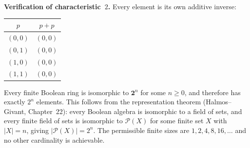 \begin{example*}
\medskip
\noindent\textbf{Verification of characteristic~$2$.}
Every element is its own additive inverse:
\begin{center}
\renewcommand{\arraystretch}{1.2}
\begin{tabular}{cc}
\toprule
$p$     & $p + p$ \\ \midrule
$(0,0)$ & $(0,0)$ \\
$(0,1)$ & $(0,0)$ \\
$(1,0)$ & $(0,0)$ \\
$(1,1)$ & $(0,0)$ \\ \bottomrule
\end{tabular}
\end{center}
\end{example*}


\begin{remark*}
Every finite Boolean ring is isomorphic to $\mathbf{2}^n$ for
some $n \ge 0$, and therefore has exactly $2^n$ elements.
This follows from the representation theorem
(Halmos--Givant, Chapter~22): every Boolean algebra is isomorphic
to a field of sets, and every finite field of sets is isomorphic
to $\mathcal{P}(X)$ for some finite set $X$ with $|X| = n$,
giving $|\mathcal{P}(X)| = 2^n$.
The permissible finite sizes are $1, 2, 4, 8, 16, \ldots$
and no other cardinality is achievable.
\end{remark*}
